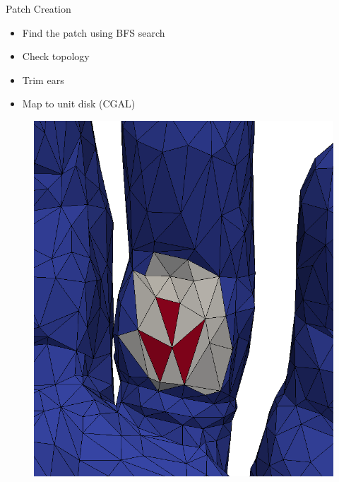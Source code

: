 \documentclass{beamer}
\begin{document}
\begin{frame}[plain]{Patch Creation}

  \begin{itemize}
  \item Find the patch using BFS search
  \item Check topology
  \item Trim ears
  \item Map to unit disk (CGAL)
  \end{itemize}
  
  \begin{figure}
    \begin{minipage}{.24\textwidth}
      \centering
      \includegraphics[width=1\linewidth]{../image/patch0.png}
    \end{minipage} 
    \begin{minipage}{0.24\textwidth}
      \centering

\end{minipage}
\end{figure}
\end{frame}
\end{document}
